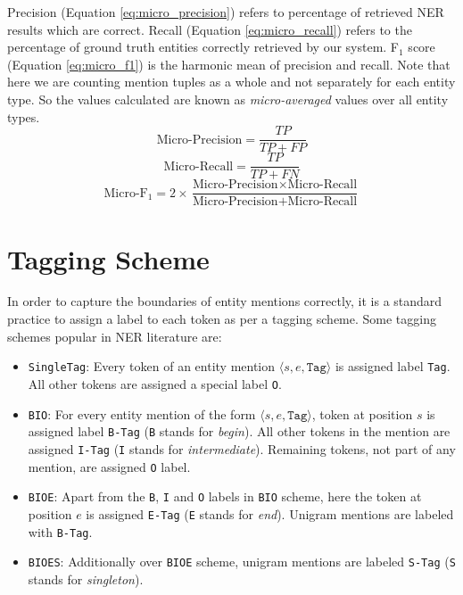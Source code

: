 Precision (Equation \ref{eq:micro_precision}) refers to percentage of retrieved NER results which are correct. Recall (Equation \ref{eq:micro_recall}) refers to the percentage of ground truth entities correctly retrieved by our system. F$_1$ score (Equation \ref{eq:micro_f1}) is the harmonic mean of precision and recall. Note that here we are counting mention tuples as a whole and not separately for each entity type. So the values calculated are known as \textit{micro-averaged} values over all entity types.
\begin{equation}
\label{eq:micro_precision}
    \text{Micro-Precision} = \frac{TP}{TP + FP}
\end{equation}
\begin{equation}
\label{eq:micro_recall}
    \text{Micro-Recall} = \frac{TP}{TP + FN}
\end{equation}
\begin{equation}
\label{eq:micro_f1}
    \text{Micro-F}_1 = 2 \times \frac{\text{Micro-Precision} \times \text{Micro-Recall}}{\text{Micro-Precision} + \text{Micro-Recall}}
\end{equation}

\section{Tagging Scheme}
\label{sec:tagging_scheme}
In order to capture the boundaries of entity mentions correctly, it is a standard practice to assign a label to each token as per a tagging scheme. Some tagging schemes popular in NER literature are:

\begin{itemize}
    \item \texttt{SingleTag}: Every token of an entity mention $\langle s, e, \texttt{Tag} \rangle$ is assigned label \texttt{Tag}. All other tokens are assigned a special label \texttt{O}.
    
    \item \texttt{BIO}: For every entity mention of the form $\langle s, e, \texttt{Tag} \rangle$, token at position $s$ is assigned label \texttt{B-Tag} (\texttt{B} stands for \textit{begin}). All other tokens in the mention are assigned \texttt{I-Tag} (\texttt{I} stands for \textit{intermediate}). Remaining tokens, not part of any mention, are assigned \texttt{O} label. 
    
    \item \texttt{BIOE}: Apart from the \texttt{B}, \texttt{I} and \texttt{O} labels in \texttt{BIO} scheme, here the token at position $e$ is assigned \texttt{E-Tag} (\texttt{E} stands for \textit{end}). Unigram mentions are labeled with \texttt{B-Tag}.
    
    \item \texttt{BIOES}: Additionally over \texttt{BIOE} scheme, unigram mentions are labeled \texttt{S-Tag} (\texttt{S} stands for \textit{singleton}).
\end{itemize}

